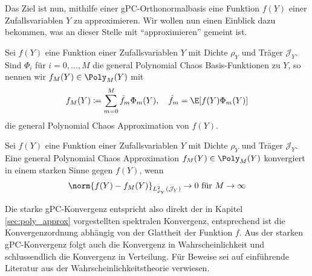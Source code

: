 Das Ziel ist nun, mithilfe einer gPC-Orthonormalbasis eine Funktion $f(Y)$ einer Zufallsvariablen $Y$ zu approximieren. Wir wollen nun einen Einblick dazu bekommen, was an dieser Stelle mit "`approximieren"' gemeint ist.
\begin{mathdef}
Sei $f(Y)$ eine Funktion einer Zufallsvariablen $Y$ mit Dichte $\rho_Y$ und Träger $\mathcal{J}_Y$. Sind $\Phi_i$ für $i=0,\dots,M$ die general Polynomial Chaos Basis-Funktionen zu $Y$, so nennen wir $f_M(Y)\in\Poly_M(Y)$ mit
\[f_M(Y)\coloneqq \sum_{m=0}^M\hat{f}_m\Phi_m(Y),\quad \hat{f}_m=\E[f(Y)\Phi_m(Y)]\]
die general Polynomial Chaos Approximation von $f(Y)$.
\end{mathdef}
\begin{mathdef}
Sei $f(Y)$ eine Funktion einer Zufallsvariablen $Y$ mit Dichte $\rho_Y$ und Träger $\mathcal{J}_Y$. Eine general Polynomial Chaos Approximation $f_M(Y)\in\Poly_M(Y)$ konvergiert in einem starken Sinne gegen $f(Y)$, wenn \[\norm{f(Y)-f_M(Y)}_{L_{\rho_Y}^2(\mathcal{J}_Y)}\to 0\text{ für }{M\to\infty}\]
\end{mathdef}
Die starke gPC-Konvergenz entspricht also direkt der in Kapitel \ref{sec:poly_approx} vorgestellten spektralen Konvergenz, entsprechend ist die Konvergenzordnung abhängig von der Glattheit der Funktion $f$. Aus der starken gPC-Konvergenz folgt auch die Konvergenz in Wahrscheinlichkeit und schlussendlich die Konvergenz in Verteilung. Für Beweise sei auf einführende Literatur aus der Wahrscheinlichkeitstheorie verwiesen.
